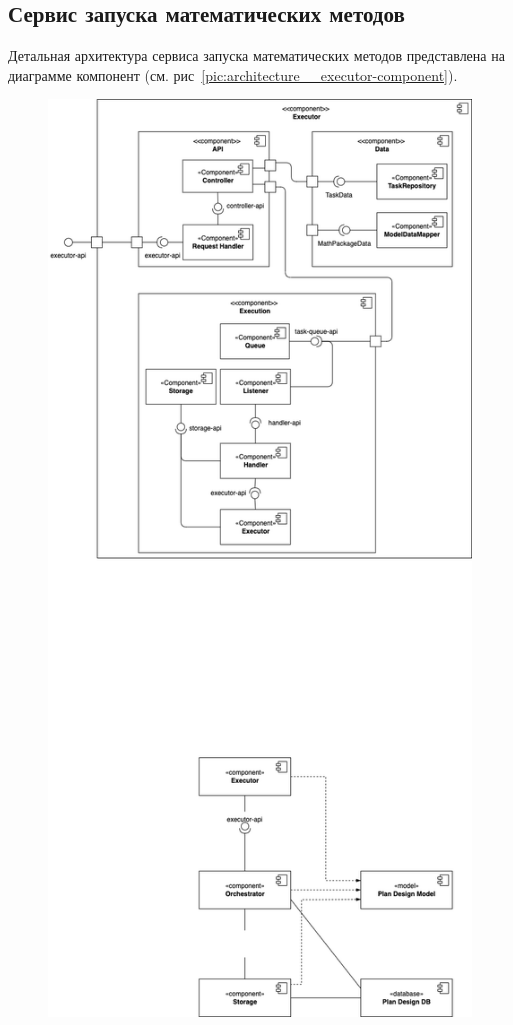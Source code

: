 \subsection{\large{Сервис запуска математических методов}}

Детальная архитектура сервиса запуска математических методов представлена на диаграмме компонент
(см. рис\ \ref{pic:architecture__executor-component}).

\begin{figure}[H]
	\hspace*{-2.5 cm}\includegraphics[width=\textwidth]{architecture/pictures/executor/component}

\end{figure}
